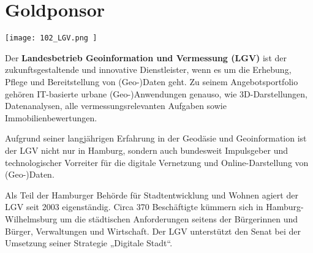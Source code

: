 \section*{Goldponsor}
\begin{flushright}
\texttt{[image: 102\_LGV.png ]}
\end{flushright}
\noindent
Der {\bfseries Landesbetrieb Geoinformation und Vermessung (LGV)} ist der zukunftsgestaltende und innovative Dienstleister, wenn es um die Erhebung, Pflege und Bereitstellung von (Geo-)Daten geht. Zu seinem Angebotsportfolio gehören IT-basierte urbane (Geo-)Anwendungen genauso, wie 3D-Darstellungen, Datenanalysen, alle vermessungsrelevanten Aufgaben sowie Immobilienbewertungen.

\noindent
Aufgrund seiner langjährigen Erfahrung in der Geodäsie und Geoinformation ist der LGV nicht nur in Hamburg, sondern auch bundesweit Impulsgeber und technologischer Vorreiter für die digitale Vernetzung und Online-Darstellung von (Geo-)Daten.

\noindent
Als Teil der Hamburger Behörde für Stadtentwicklung und Wohnen agiert der LGV seit 2003 eigenständig. Circa 370 Beschäftigte kümmern sich in Hamburg-Wilhelmsburg um die städtischen Anforderungen seitens der Bürgerinnen und Bürger, Verwaltungen und Wirtschaft. Der LGV unterstützt den Senat bei der Umsetzung seiner Strategie „Digitale Stadt“.

